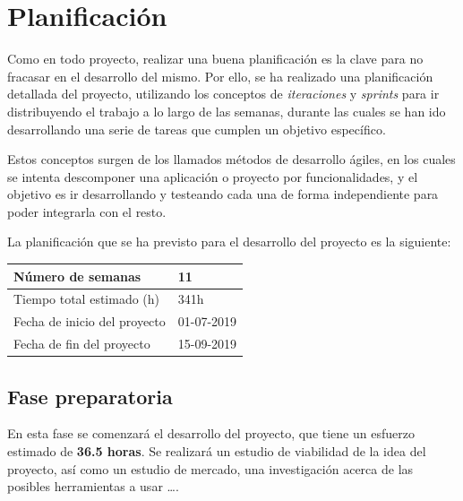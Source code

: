 


\pagestyle{miEstilo2}

\section{Planificación}

Como en todo proyecto, realizar una buena planificación es la clave para no fracasar en el desarrollo del mismo. Por ello, se ha realizado una planificación detallada del proyecto, utilizando los conceptos de \textit{iteraciones} y \textit{sprints} para ir distribuyendo el trabajo a lo largo de las semanas, durante las cuales se han ido desarrollando una serie de tareas que cumplen un objetivo específico.

Estos conceptos surgen de los llamados métodos de desarrollo ágiles, en los cuales se intenta descomponer una aplicación o proyecto por funcionalidades, y el objetivo es ir desarrollando y testeando cada una de forma independiente para poder integrarla con el resto.

La planificación que se ha previsto para el desarrollo del proyecto es la siguiente:

\begin{table}[h!]
\centering
\begin{tabular}{|p{5cm}|p{4cm}|}
 \hline
	\cellcolor[gray]{0.9} Número de semanas  & 11\\ \hline
	\cellcolor[gray]{0.9} Tiempo total estimado (h)  & 341h \\ \hline
	\cellcolor[gray]{0.9} Fecha de inicio del proyecto  & 01-07-2019 \\ \hline
	\cellcolor[gray]{0.9} Fecha de fin del proyecto  & 15-09-2019 \\ \hline
		
\end{tabular}
\end{table}

\subsection{Fase preparatoria}

En esta fase se comenzará el desarrollo del proyecto, que tiene un esfuerzo estimado de \textbf{36.5 horas}. Se realizará un estudio de viabilidad de la idea del proyecto, así como un estudio de mercado, una investigación acerca de las posibles herramientas a usar \ldots.


